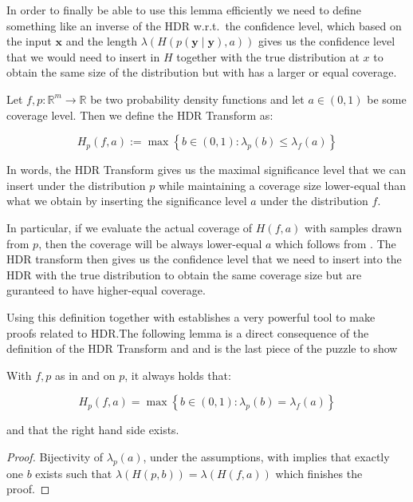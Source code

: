 In order to finally be able to use this lemma efficiently we need to define something like an inverse of the HDR w.r.t.\ the confidence level, which based on the input $\mathbf{x}$ and the length $\lambda(H(p(\mathbf{y} \mid \mathbf{y}), a))$ gives us the confidence level that we would need to insert in $H$ together with the true distribution at $x$ to obtain the same size of the distribution but with  has a larger or equal coverage.

\begin{definition}\label{def:hdr_transform}
    Let $f,p : \mathbb{R}^m \to \mathbb{R}$ be two probability density functions and let $a \in (0,1)$ be some coverage level. Then we define the HDR Transform as:

    \begin{equation}
        H_p(f, a) := \max \left\{b \in (0,1):  \lambda_p(b) \leq \lambda_f(a)\right\}
    \end{equation}

\end{definition}
In words, the HDR Transform gives us the maximal significance level that we can insert under the distribution $p$ while maintaining a coverage size lower-equal than what we obtain by inserting the significance level $a$ under the distribution $f$.

In particular, if we evaluate the actual coverage of $H(f, a)$ with samples drawn from $p$, then the coverage will be always lower-equal $a$ which follows from . The HDR transform then gives us the confidence level that we need to insert into the HDR with the true distribution to obtain the same coverage size but are guranteed to have higher-equal coverage.

Using this definition together with  establishes a very powerful tool to make proofs related to HDR.\@ The following lemma is a direct consequence of the definition of the HDR Transform and  and is the last piece of the puzzle to show 

\begin{lemma}\label{lem:hdr_optimality}
    With $f,p$ as in  and  on $p$, it always holds that:

    \begin{equation}
        H_p(f, a) = \max \left\{b \in (0,1): \lambda_p(b) = \lambda_f(a)\right\}
    \end{equation}

    and that the right hand side exists.
\end{lemma}
\begin{proof}
    Bijectivity of $\lambda_p(a)$, under the assumptions, with  implies that exactly one $b$ exists such that $\lambda(H(p, b)) = \lambda(H(f, a))$ which finishes the proof.
\end{proof}

